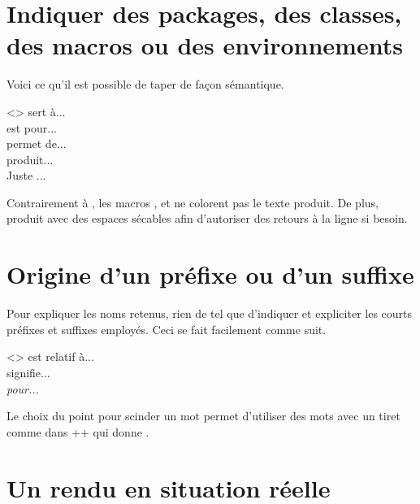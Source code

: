 \section{Indiquer des packages, des classes, des macros ou des environnements}

Voici ce qu'il est possible de taper de façon sémantique.


\begin{tdoclatex}<>
 sert à...      \\
 est pour... \\
 permet de... \\
 produit...          \\
Juste ...
\end{tdoclatex}


\begin{tdocrem}
    Contrairement à , les macros ,  et  ne colorent pas le texte produit.
    De plus,  produit  avec des espaces sécables afin d'autoriser des retours à la ligne si besoin.
\end{tdocrem}



\section{Origine d'un préfixe ou d'un suffixe}

Pour expliquer les noms retenus, rien de tel que d'indiquer et expliciter les courts préfixes et suffixes employés. Ceci se fait facilement comme suit.


\begin{tdoclatex}<>
 est relatif à...     \\
 signifie...  \\
\emph{ pour...}
\end{tdoclatex}


\begin{tdocrem}
    Le choix du point pour scinder un mot permet d'utiliser des mots avec un tiret comme dans \tdoclatexin++ qui donne .
\end{tdocrem}


\section{Un rendu en situation réelle}
\label{tutodoc-showcase}

